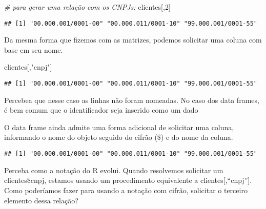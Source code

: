 \documentclass[
]{book}
\newenvironment{Shaded}{\begin{snugshade}}{\end{snugshade}}
\newcommand{\CommentTok}[1]{\textcolor[rgb]{0.56,0.35,0.01}{\textit{#1}}}
\newcommand{\DecValTok}[1]{\textcolor[rgb]{0.00,0.00,0.81}{#1}}
\newcommand{\NormalTok}[1]{#1}
\newcommand{\OperatorTok}[1]{\textcolor[rgb]{0.81,0.36,0.00}{\textbf{#1}}}
\newcommand{\StringTok}[1]{\textcolor[rgb]{0.31,0.60,0.02}{#1}}
\begin{document}
\begin{Shaded}
\begin{Highlighting}[]
\CommentTok{# para gerar uma relação com os CNPJs:}
\NormalTok{clientes[,}\DecValTok{2}\NormalTok{]}
\end{Highlighting}
\end{Shaded}

\begin{verbatim}
## [1] "00.000.001/0001-00" "00.000.011/0001-10" "99.000.001/0001-55"
\end{verbatim}

Da mesma forma que fizemos com as matrizes, podemos solicitar uma coluna com base em seu nome.

\begin{Shaded}
\begin{Highlighting}[]
\NormalTok{clientes[,}\StringTok{"cnpj"}\NormalTok{]}
\end{Highlighting}
\end{Shaded}

\begin{verbatim}
## [1] "00.000.001/0001-00" "00.000.011/0001-10" "99.000.001/0001-55"
\end{verbatim}

Percebea que nesse caso as linhas não foram nomeadas. No caso dos data frames, é bem comum que o identificador seja inserido como um dado

O data frame ainda admite uma forma adicional de solicitar uma coluna, informando o nome do objeto seguido do cifrão (\$) e do nome da coluna.

\begin{Shaded}
\end{Shaded}

\begin{verbatim}
## [1] "00.000.001/0001-00" "00.000.011/0001-10" "99.000.001/0001-55"
\end{verbatim}

Perceba como a notação do R evolui. Quando resolvemos solicitar um clientes\$cnpj, estamos usando um procedimento equivalente a clientes{[},``cnpj''{]}. Como poderíamos fazer para usando a notação com cifrão, solicitar o terceiro elemento dessa relação?

\begin{Shaded}
\end{Shaded}
\end{document}
